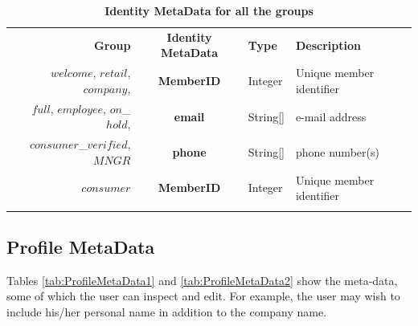 \begin{table}[H]
\vspace{-0.5cm}
\begin{centering}
{
\begin{tabular}{ r | c | l | l }
\hline
\textbf{Group}	& {\bf Identity MetaData} & {\bf Type} & {\bf Description} \\
\Xhline{1.5pt}
$welcome$, $retail$, $company$,	& {\bf MemberID}			&Integer	& Unique member identifier \\
$full$, $employee$, $on$\_$hold$,	& {\bf email}				&String[]	& e-mail address \\		
$consumer$\_$verified$, $MNGR$	& {\bf phone}				&String[]	& phone number(s) \\
\hline
$consumer$	& {\bf MemberID}	&Integer & Unique member identifier \\
\Xhline{1.5pt}
\end{tabular}
}
\caption{\small\textbf{Identity MetaData for all the groups}}
\label{tab:IdentityMetaData}
\end{centering}
\vspace{-1cm}
\end{table}

\subsection{Profile MetaData}
Tables \ref{tab:ProfileMetaData1} and \ref{tab:ProfileMetaData2} show the meta-data, some of which the user can inspect and edit. For example, the user may wish to include his/her personal name in addition to the company name.

